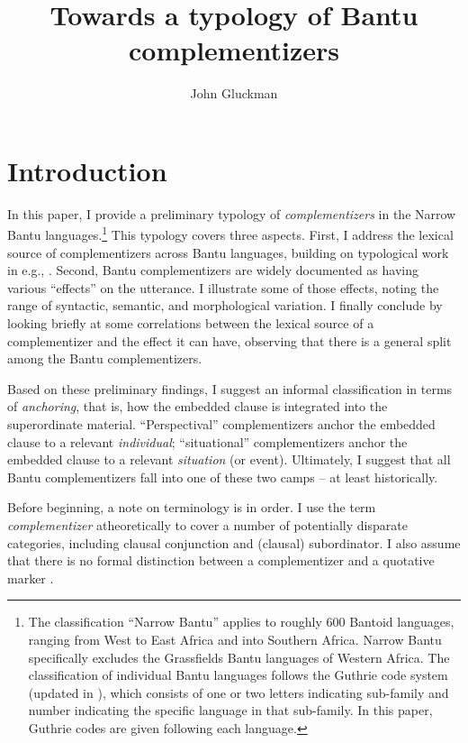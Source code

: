 \documentclass[output=paper,colorlinks,citecolor=brown,
]{langscibook}
\author{John Gluckman\affiliation{University of Kansas}}
\title{Towards a typology of Bantu complementizers}
\begin{document}
\maketitle

\section{Introduction}\label{sec:gluckman:introduction}

In this paper, I provide a preliminary typology of \textit{complementizers} in the Narrow Bantu languages.\footnote{The classification ``Narrow Bantu'' applies to roughly 600 Bantoid languages, ranging from West to East Africa and into Southern Africa. Narrow Bantu specifically excludes the Grassfields Bantu languages of Western Africa. The classification of individual Bantu languages follows the Guthrie code system (updated in \citealt{Hammarstrom:2019}), which consists of one or two letters indicating sub-family and number indicating the specific language in that sub-family. In this paper, Guthrie codes are given following each language.} This typology covers three aspects. First, I address the lexical source of complementizers across Bantu languages, building on typological work in e.g., \citet{Cristofaro:2003, Kutevaetal:2019}. 
Second, Bantu complementizers are widely documented as having various ``effects'' on the utterance. I illustrate some of those effects, noting the range of syntactic, semantic, and morphological variation. I finally conclude by looking briefly at some correlations between the lexical source of a complementizer and the effect it can have, observing that there is a general split among the Bantu complementizers.

Based on these preliminary findings, I suggest an informal classification in terms of \textit{anchoring}, that is, how the embedded clause is integrated into the superordinate material. ``Perspectival'' complementizers anchor the embedded clause to a relevant \textit{individual}; ``situational'' complementizers anchor the embedded clause to a relevant \textit{situation} (or event). Ultimately, I suggest that all Bantu complementizers fall into one of these two camps -- at least historically.  


Before beginning, a note on terminology is in order. I use the term \textit{complementizer} atheoretically to cover a number of potentially disparate categories, including clausal conjunction and (clausal) subordinator. I also assume that there is no formal distinction between a complementizer and a quotative marker \citep{Guldemann:2002}. 
\end{document}
